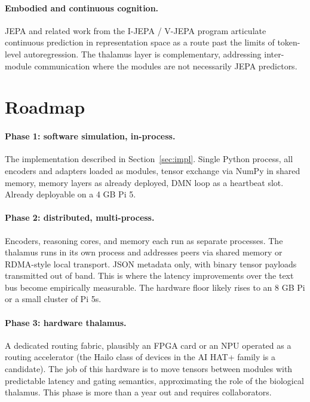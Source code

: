 \documentclass[11pt]{article}
\begin{document}
\paragraph{Embodied and continuous cognition.}
JEPA \cite{jepa} and related work from the I-JEPA / V-JEPA
program articulate continuous prediction in representation
space as a route past the limits of token-level autoregression.
The thalamus layer is complementary, addressing inter-module
communication where the modules are not necessarily JEPA
predictors.

\section{Roadmap}
\label{sec:roadmap}

\paragraph{Phase 1: software simulation, in-process.} The
implementation described in Section~\ref{sec:impl}. Single
Python process, all encoders and adapters loaded as modules,
tensor exchange via NumPy in shared memory, memory layers as
already deployed, DMN loop as a heartbeat slot. Already
deployable on a 4 GB Pi 5.

\paragraph{Phase 2: distributed, multi-process.} Encoders,
reasoning cores, and memory each run as separate processes.
The thalamus runs in its own process and addresses peers via
shared memory or RDMA-style local transport. JSON metadata
only, with binary tensor payloads transmitted out of band. This
is where the latency improvements over the text bus become
empirically measurable. The hardware floor likely rises to an
8 GB Pi or a small cluster of Pi 5s.

\paragraph{Phase 3: hardware thalamus.} A dedicated routing
fabric, plausibly an FPGA card or an NPU operated as a routing
accelerator (the Hailo class of devices in the AI HAT+ family
is a candidate). The job of this hardware is to move tensors
between modules with predictable latency and gating semantics,
approximating the role of the biological thalamus. This phase
is more than a year out and requires collaborators.
\end{document}
